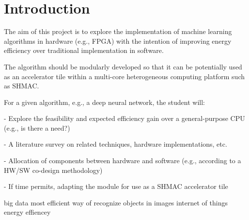 \chapter{Introduction}


The aim of this project is to explore the implementation of machine learning algorithms in hardware (e.g., FPGA) with the intention of improving energy efficiency over traditional implementation in software.

The algorithm should be modularly developed so that it can be potentially used as an accelerator tile within a multi-core heterogeneous computing platform such as SHMAC.

For a given algorithm, e.g., a deep neural network, the student will:

- Explore the feasibility and expected efficiency gain over a general-purpose CPU (e.g., is there a need?)

- A literature survey on related techniques, hardware implementations, etc.

- Allocation of components between hardware and software (e.g., according to a HW/SW co-design methodology)

- If time permits, adapting the module for use as a SHMAC accelerator tile


big data
most efficient way of recognize objects in images
internet of things
energy effiencey